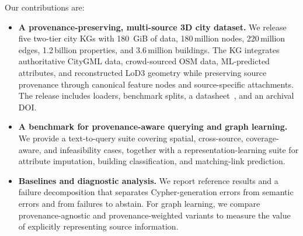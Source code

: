 \documentclass[sigconf,authordraft]{acmart}
\newcommand{\verify}[1]{\begingroup\setlength{\fboxsep}{1pt}\colorbox{red!25}{#1}\endgroup}
\begin{document}
Our contributions are: 
\begin{itemize} 
  \item \textbf{A provenance-preserving, multi-source 3D city dataset.} We release five two-tier city KGs with 180~GiB of data, 180\,million nodes, 220\,million edges, 1.2\,billion properties, and 3.6\,million buildings. The KG integrates authoritative CityGML data, crowd-sourced OSM data, ML-predicted attributes, and reconstructed LoD3 geometry while preserving source provenance through canonical feature nodes and source-specific attachments. The release includes loaders, benchmark splits, a datasheet~\cite{gebru_datasheets_2021}, and an archival DOI. 
  \item \textbf{A benchmark for provenance-aware querying and graph learning.} We provide a text-to-query suite covering spatial, cross-source, coverage-aware, and infeasibility cases, together with a representation-learning suite for attribute imputation, building classification, and matching-link prediction. 
  \item \textbf{Baselines and diagnostic analysis.} 
  We report reference results and a failure decomposition that separates Cypher-generation errors from semantic errors and from failures to abstain.
  For graph learning, we compare provenance-agnostic and provenance-weighted variants to measure the value of explicitly representing source information. 
\end{itemize}
\end{document}
